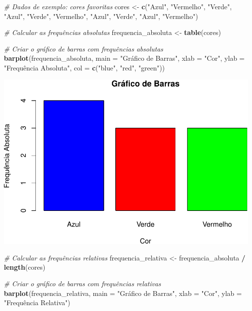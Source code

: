 \documentclass[
]{book}
\newenvironment{Shaded}{\begin{snugshade}}{\end{snugshade}}
\newcommand{\AttributeTok}[1]{\textcolor[rgb]{0.13,0.29,0.53}{#1}}
\newcommand{\CommentTok}[1]{\textcolor[rgb]{0.56,0.35,0.01}{\textit{#1}}}
\newcommand{\FunctionTok}[1]{\textcolor[rgb]{0.13,0.29,0.53}{\textbf{#1}}}
\newcommand{\NormalTok}[1]{#1}
\newcommand{\OtherTok}[1]{\textcolor[rgb]{0.56,0.35,0.01}{#1}}
\newcommand{\SpecialCharTok}[1]{\textcolor[rgb]{0.81,0.36,0.00}{\textbf{#1}}}
\newcommand{\StringTok}[1]{\textcolor[rgb]{0.31,0.60,0.02}{#1}}
\begin{document}
\begin{Shaded}
\begin{Highlighting}[]
\CommentTok{\# Dados de exemplo: cores favoritas}
\NormalTok{cores }\OtherTok{\textless{}{-}} \FunctionTok{c}\NormalTok{(}\StringTok{"Azul"}\NormalTok{, }\StringTok{"Vermelho"}\NormalTok{, }\StringTok{"Verde"}\NormalTok{, }\StringTok{"Azul"}\NormalTok{, }\StringTok{"Verde"}\NormalTok{, }
\StringTok{"Vermelho"}\NormalTok{, }\StringTok{"Azul"}\NormalTok{, }\StringTok{"Verde"}\NormalTok{, }\StringTok{"Azul"}\NormalTok{, }\StringTok{"Vermelho"}\NormalTok{)}

\CommentTok{\# Calcular as frequências absolutas}
\NormalTok{frequencia\_absoluta }\OtherTok{\textless{}{-}} \FunctionTok{table}\NormalTok{(cores)}

\CommentTok{\# Criar o gráfico de barras com frequências absolutas}
\FunctionTok{barplot}\NormalTok{(frequencia\_absoluta,}
  \AttributeTok{main =} \StringTok{"Gráfico de Barras"}\NormalTok{,         }
  \AttributeTok{xlab =} \StringTok{"Cor"}\NormalTok{,         }
  \AttributeTok{ylab =} \StringTok{"Frequência Absoluta"}\NormalTok{,         }
  \AttributeTok{col =} \FunctionTok{c}\NormalTok{(}\StringTok{"blue"}\NormalTok{, }\StringTok{"red"}\NormalTok{, }\StringTok{"green"}\NormalTok{)) }
\end{Highlighting}
\end{Shaded}

\includegraphics{meuLivro2_files/figure-latex/unnamed-chunk-104-1.pdf}

\begin{Shaded}
\begin{Highlighting}[]
\CommentTok{\# Calcular as frequências relativas}
\NormalTok{frequencia\_relativa }\OtherTok{\textless{}{-}}\NormalTok{ frequencia\_absoluta }\SpecialCharTok{/} \FunctionTok{length}\NormalTok{(cores)  }
    
\CommentTok{\# Criar o gráfico de barras com frequências relativas}
\FunctionTok{barplot}\NormalTok{(frequencia\_relativa,         }
  \AttributeTok{main =} \StringTok{"Gráfico de Barras"}\NormalTok{,         }
  \AttributeTok{xlab =} \StringTok{"Cor"}\NormalTok{,         }
  \AttributeTok{ylab =} \StringTok{"Frequência Relativa"}\NormalTok{) }
\end{Highlighting}
\end{Shaded}
\end{document}
